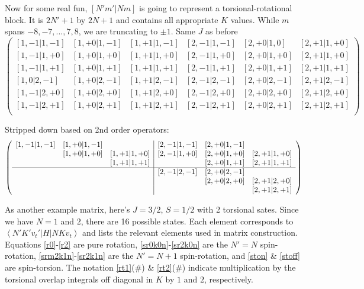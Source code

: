 \documentclass{article}
\begin{document}
Now for some real fun, $[N'm'|Nm]$ is going to represent a torsional-rotational block. It is $2N'+1$ by $2N+1$ and contains all appropriate $K$ values. While $m$ spans $-8,-7,...,7,8$, we are truncating to $\pm1$. Same $J$ as before
\[
\left(
\begin{array}{ccc|ccc}
\left[1,-1|1,-1\right] & \left[1,+0|1,-1\right] & \left[1,+1|1,-1\right] & \left[2,-1|1,-1\right] & \left[2,+0|1,0\right] & \left[2,+1|1,+0\right] \\
\left[1,-1|1,+0\right] & \left[1,+0|1,+0\right] & \left[1,+1|1,+0\right] & \left[2,-1|1,+0\right] & \left[2,+0|1,+0\right] & \left[2,+1|1,+0\right] \\
\left[1,-1|1,+1\right] & \left[1,+0|1,+1\right] & \left[1,+1|1,+1\right] & \left[2,-1|1,+1\right] & \left[2,+0|1,+1\right] & \left[2,+1|1,+1\right] \\
\hline
\left[1,0|2,-1\right] & \left[1,+0|2,-1\right] & \left[1,+1|2,-1\right] & \left[2,-1|2,-1\right] & \left[2,+0|2,-1\right] & \left[2,+1|2,-1\right] \\
\left[1,-1|2,+0\right] & \left[1,+0|2,+0\right] & \left[1,+1|2,+0\right] & \left[2,-1|2,+0\right] & \left[2,+0|2,+0\right] & \left[2,+1|2,+0\right] \\
\left[1,-1|2,+1\right] & \left[1,+0|2,+1\right] & \left[1,+1|2,+1\right] & \left[2,-1|2,+1\right] & \left[2,+0|2,+1\right] & \left[2,+1|2,+1\right] \\
\end{array}
\right)
\]

Stripped down based on 2nd order operators:
\[
\left(
\begin{array}{ccc|ccc}
\left[1,-1|1,-1\right] & \left[1,+0|1,-1\right] &  & \left[2,-1|1,-1\right] & \left[2,+0|1,-1\right] & \\
& \left[1,+0|1,+0\right] & \left[1,+1|1,+0\right] & \left[2,-1|1,+0\right] & \left[2,+0|1,+0\right] & \left[2,+1|1,+0\right] \\
& & \left[1,+1|1,+1\right] &  & \left[2,+0|1,+1\right] & \left[2,+1|1,+1\right] \\
\hline
& & & \left[2,-1|2,-1\right] & \left[2,+0|2,-1\right] & \\
& & & & \left[2,+0|2,+0\right] & \left[2,+1|2,+0\right] \\
& & & & & \left[2,+1|2,+1\right] \\
\end{array}
\right)
\]

As another example matrix, here's $J=3/2$, $S=1/2$ with 2 torsional sates. Since we have $N=1$ and $2$, there are 16 possible states. Each element corresponds to $\left\langle N'K' v_{t}'\right|H\left|NKv_{t}\right\rangle$ and lists the relevant elements used in matrix construction. Equations \ref{r0}-\ref{r2} are pure rotation, \ref{sr0k0n}-\ref{sr2k0n} are the $N'=N$ spin-rotation, \ref{srm2k1n}-\ref{sr2k1n} are the $N'=N+1$ spin-rotation, and \ref{ston} \& \ref{stoff} are spin-torsion. The notation \ref{rt1}(\#) \& \ref{rt2}(\#) indicate multiplication by the torsional overlap integrals off diagonal in $K$ by $1$ and $2$, respectively.
\end{document}
